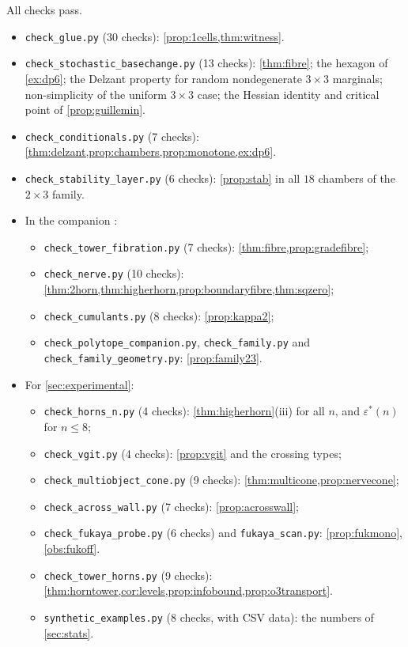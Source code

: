 \documentclass[11pt]{article}
\theoremstyle{definition}
\theoremstyle{remark}
\begin{document}
All checks pass.
\begin{itemize}[leftmargin=*]
\item \texttt{check\_glue.py} (30 checks): \cref{prop:1cells,thm:witness}.
\item \texttt{check\_stochastic\_basechange.py} (13 checks): \cref{thm:fibre}; the hexagon of \cref{ex:dp6}; the Delzant
  property for random nondegenerate $3\times3$ marginals; non-simplicity of the uniform $3\times3$ case; the Hessian
  identity and critical point of \cref{prop:guillemin}.
\item \texttt{check\_conditionals.py} (7 checks): \cref{thm:delzant,prop:chambers,prop:monotone,ex:dp6}.
\item \texttt{check\_stability\_layer.py} (6 checks): \cref{prop:stab} in all $18$ chambers of the $2\times3$ family.
\item In the companion \cite{Awasthi-Family}:
  \begin{itemize}[leftmargin=*]
  \item \texttt{check\_tower\_fibration.py} (7 checks): \cref{thm:fibre,prop:gradefibre};
  \item \texttt{check\_nerve.py} (10 checks): \cref{thm:2horn,thm:higherhorn,prop:boundaryfibre,thm:sqzero};
  \item \texttt{check\_cumulants.py} (8 checks): \cref{prop:kappa2};
  \item \texttt{check\_polytope\_companion.py}, \texttt{check\_family.py} and \texttt{check\_family\_geometry.py}:
    \cref{prop:family23}.
  \end{itemize}
\item For \cref{sec:experimental}:
  \begin{itemize}[leftmargin=*]
  \item \texttt{check\_horns\_n.py} (4 checks): \cref{thm:higherhorn}(iii) for all $n$, and $\varepsilon^*(n)$ for $n\le8$;
  \item \texttt{check\_vgit.py} (4 checks): \cref{prop:vgit} and the crossing types;
  \item \texttt{check\_multiobject\_cone.py} (9 checks): \cref{thm:multicone,prop:nervecone};
  \item \texttt{check\_across\_wall.py} (7 checks): \cref{prop:acrosswall};
  \item \texttt{check\_fukaya\_probe.py} (6 checks) and \texttt{fukaya\_scan.py}: \cref{prop:fukmono}, \cref{obs:fukoff}.
  \item \texttt{check\_tower\_horns.py} (9 checks): \cref{thm:horntower,cor:levels,prop:infobound,prop:o3transport}.
  \item \texttt{synthetic\_examples.py} (8 checks, with CSV data): the numbers of \cref{sec:stats}.
  \end{itemize}
\end{itemize}
\end{document}
